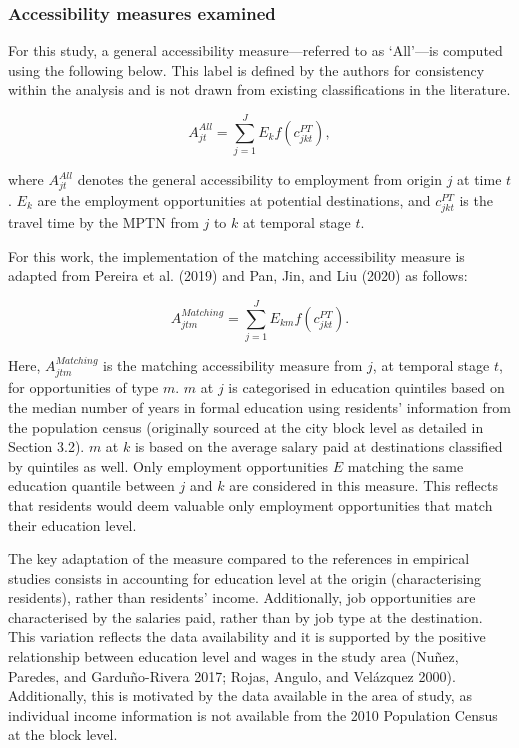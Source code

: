 \documentclass{article}
\begin{document}
\subsubsection{Accessibility measures
examined}\label{accessibility-measures-examined}

For this study, a general accessibility measure---referred to as
`All'---is computed using the following below. This label is defined by
the authors for consistency within the analysis and is not drawn from
existing classifications in the literature.

\begin{equation}
  A^{All}_{jt} = \sum^J_{j=1} E_k f(c^{PT}_{jkt}),
   \label{eq:empirical-access-general}
\end{equation}

where \(A^{All}_{jt}\) denotes the general accessibility to employment
from origin \(j\) at time \(t\). \(E_k\) are the employment
opportunities at potential destinations, and \(c^{PT}_{jkt}\) is the
travel time by the MPTN from \(j\) to \(k\) at temporal stage \(t\).

For this work, the implementation of the matching accessibility measure
is adapted from Pereira et al. (2019) and Pan, Jin, and Liu (2020) as
follows:

\begin{equation}
  A^{Matching}_{jtm} = \sum^J_{j=1} E_{km} f(c^{PT}_{jkt}).
   \label{eq:empirical-access-matching}
\end{equation}

Here, \(A^{Matching}_{jtm}\) is the matching accessibility measure from
\(j\), at temporal stage \(t\), for opportunities of type \(m\). \(m\)
at \(j\) is categorised in education quintiles based on the median
number of years in formal education using residents' information from
the population census (originally sourced at the city block level as
detailed in Section 3.2). \(m\) at \(k\) is based on the average salary
paid at destinations classified by quintiles as well. Only employment
opportunities \(E\) matching the same education quantile between \(j\)
and \(k\) are considered in this measure. This reflects that residents
would deem valuable only employment opportunities that match their
education level.

The key adaptation of the measure compared to the references in
empirical studies consists in accounting for education level at the
origin (characterising residents), rather than residents' income.
Additionally, job opportunities are characterised by the salaries paid,
rather than by job type at the destination. This variation reflects the
data availability and it is supported by the positive relationship
between education level and wages in the study area (Nuñez, Paredes, and
Garduño-Rivera 2017; Rojas, Angulo, and Velázquez 2000). Additionally,
this is motivated by the data available in the area of study, as
individual income information is not available from the 2010 Population
Census at the block level.
\end{document}
